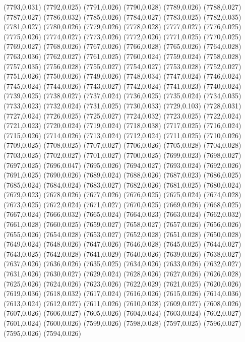 (7793,0.031)
(7792,0.025)
(7791,0.026)
(7790,0.028)
(7789,0.026)
(7788,0.027)
(7787,0.027)
(7786,0.032)
(7785,0.026)
(7784,0.027)
(7783,0.025)
(7782,0.035)
(7781,0.027)
(7780,0.026)
(7779,0.026)
(7778,0.028)
(7777,0.027)
(7776,0.025)
(7775,0.026)
(7774,0.027)
(7773,0.026)
(7772,0.026)
(7771,0.025)
(7770,0.025)
(7769,0.027)
(7768,0.026)
(7767,0.026)
(7766,0.028)
(7765,0.026)
(7764,0.028)
(7763,0.036)
(7762,0.027)
(7761,0.025)
(7760,0.024)
(7759,0.024)
(7758,0.028)
(7757,0.035)
(7756,0.028)
(7755,0.027)
(7754,0.027)
(7753,0.028)
(7752,0.027)
(7751,0.026)
(7750,0.026)
(7749,0.026)
(7748,0.034)
(7747,0.024)
(7746,0.024)
(7745,0.024)
(7744,0.026)
(7743,0.027)
(7742,0.024)
(7741,0.023)
(7740,0.024)
(7739,0.025)
(7738,0.027)
(7737,0.024)
(7736,0.025)
(7735,0.024)
(7734,0.035)
(7733,0.023)
(7732,0.024)
(7731,0.025)
(7730,0.033)
(7729,0.103)
(7728,0.031)
(7727,0.024)
(7726,0.025)
(7725,0.027)
(7724,0.032)
(7723,0.025)
(7722,0.024)
(7721,0.023)
(7720,0.024)
(7719,0.024)
(7718,0.038)
(7717,0.025)
(7716,0.024)
(7715,0.026)
(7714,0.026)
(7713,0.024)
(7712,0.024)
(7711,0.025)
(7710,0.026)
(7709,0.025)
(7708,0.025)
(7707,0.027)
(7706,0.026)
(7705,0.028)
(7704,0.028)
(7703,0.025)
(7702,0.027)
(7701,0.027)
(7700,0.025)
(7699,0.023)
(7698,0.027)
(7697,0.025)
(7696,0.047)
(7695,0.026)
(7694,0.027)
(7693,0.024)
(7692,0.026)
(7691,0.025)
(7690,0.026)
(7689,0.024)
(7688,0.026)
(7687,0.023)
(7686,0.025)
(7685,0.024)
(7684,0.024)
(7683,0.027)
(7682,0.026)
(7681,0.025)
(7680,0.024)
(7679,0.023)
(7678,0.026)
(7677,0.026)
(7676,0.025)
(7675,0.024)
(7674,0.028)
(7673,0.025)
(7672,0.024)
(7671,0.027)
(7670,0.025)
(7669,0.026)
(7668,0.025)
(7667,0.024)
(7666,0.032)
(7665,0.024)
(7664,0.023)
(7663,0.024)
(7662,0.032)
(7661,0.028)
(7660,0.025)
(7659,0.027)
(7658,0.027)
(7657,0.026)
(7656,0.026)
(7655,0.026)
(7654,0.028)
(7653,0.027)
(7652,0.028)
(7651,0.028)
(7650,0.028)
(7649,0.024)
(7648,0.026)
(7647,0.026)
(7646,0.028)
(7645,0.025)
(7644,0.027)
(7643,0.025)
(7642,0.028)
(7641,0.029)
(7640,0.026)
(7639,0.026)
(7638,0.027)
(7637,0.026)
(7636,0.026)
(7635,0.025)
(7634,0.026)
(7633,0.026)
(7632,0.027)
(7631,0.026)
(7630,0.027)
(7629,0.024)
(7628,0.026)
(7627,0.026)
(7626,0.028)
(7625,0.026)
(7624,0.026)
(7623,0.026)
(7622,0.029)
(7621,0.025)
(7620,0.026)
(7619,0.036)
(7618,0.032)
(7617,0.024)
(7616,0.026)
(7615,0.026)
(7614,0.036)
(7613,0.024)
(7612,0.027)
(7611,0.026)
(7610,0.028)
(7609,0.027)
(7608,0.026)
(7607,0.026)
(7606,0.027)
(7605,0.026)
(7604,0.024)
(7603,0.024)
(7602,0.027)
(7601,0.024)
(7600,0.026)
(7599,0.026)
(7598,0.028)
(7597,0.025)
(7596,0.027)
(7595,0.026)
(7594,0.026)
